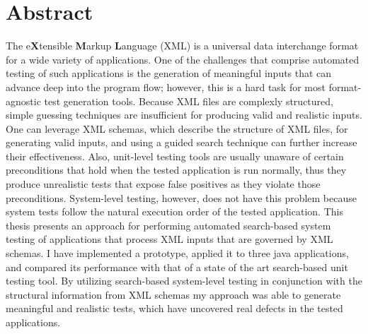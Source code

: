 \section*{Abstract}
The e{\bfseries X}tensible {\bfseries M}arkup {\bfseries L}anguage (XML) is 
a universal data interchange format for a wide variety of applications. 
One of the challenges that comprise automated testing of such applications is the generation of meaningful inputs that 
can advance deep into the program flow; 
however, this is a hard task for most format-agnostic test generation tools. 
Because XML files are complexly structured, simple guessing techniques are insufficient for producing valid and realistic inputs. 
One can leverage XML schemas, which describe the structure of XML files, for generating valid inputs, and 
using a guided search technique can further increase their effectiveness. 
Also, unit-level testing tools are usually unaware of certain preconditions that hold when 
the tested application is run normally, thus they produce unrealistic tests that expose false positives as they 
violate those preconditions. System-level testing, however, does not have this problem because system tests follow the 
natural execution order of the tested application. 
This thesis presents an approach for performing automated search-based system testing of 
applications that process XML inputs that are governed by XML schemas. 
I have implemented a prototype, applied it to three java applications, and compared its performance with 
that of a state of the art search-based unit testing tool. 
By utilizing search-based system-level testing in conjunction with the structural information from 
XML schemas my approach was able to generate meaningful and realistic tests, which have uncovered real defects in the 
tested applications.  